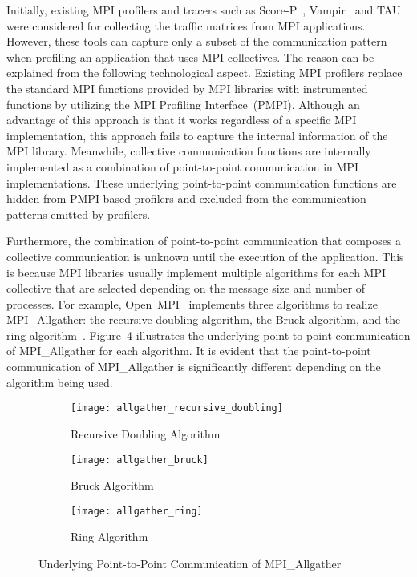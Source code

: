 Initially, existing MPI profilers and tracers such as
\mbox{Score-P}~\autocite{Knupfer2012}, Vampir~\autocite{Knupfer2008} and
TAU~\autocite{Shende2006} were considered for collecting the traffic matrices
from MPI applications. However, these tools can capture only a subset of the
communication pattern when profiling an application that uses MPI collectives.
The reason can be explained from the following technological aspect. Existing
MPI profilers replace the standard MPI functions provided by MPI libraries
with instrumented functions by utilizing the MPI Profiling Interface~(PMPI).
Although an advantage of this approach is that it works regardless of a
specific MPI implementation, this approach fails to capture the internal
information of the MPI library. Meanwhile, collective communication functions
are internally implemented as a combination of point-to-point communication in
MPI implementations. These underlying point-to-point communication functions
are hidden from PMPI-based profilers and excluded from the communication
patterns emitted by profilers.

Furthermore, the combination of point-to-point communication that composes a
collective communication is unknown until the execution of the application.
This is because MPI libraries usually implement multiple algorithms for each
MPI collective that are selected depending on the message size and number of
processes. For example, Open~MPI~\cite{Gabriel2004} implements three
algorithms to realize MPI\_Allgather: the recursive doubling algorithm, the
Bruck algorithm, and the ring algorithm~\cite{Rabenseifner2004}.
Figure~\ref{fig:allgather-algorithms} illustrates the underlying point-to-point
communication of MPI\_Allgather for each algorithm. It is evident that the
point-to-point communication of MPI\_Allgather is significantly different
depending on the algorithm being used.

\begin{figure}
    \centering
    \begin{subfigure}{\linewidth}
        \centering
        \texttt{[image: allgather\_recursive\_doubling]}
        \caption{Recursive Doubling Algorithm}%
        \label{fig:allgather-recursive}
    \end{subfigure}
    \begin{subfigure}{\linewidth}
        \centering
        \texttt{[image: allgather\_bruck]}
        \caption{Bruck Algorithm}%
        \label{fig:allgather-bruck}
    \end{subfigure}
    \begin{subfigure}{\linewidth}
        \centering
        \texttt{[image: allgather\_ring]}
        \caption{Ring Algorithm}%
        \label{fig:allgather-ring}
    \end{subfigure}
    \caption{Underlying Point-to-Point Communication of MPI\_Allgather}%
    \label{fig:allgather-algorithms}
\end{figure}


